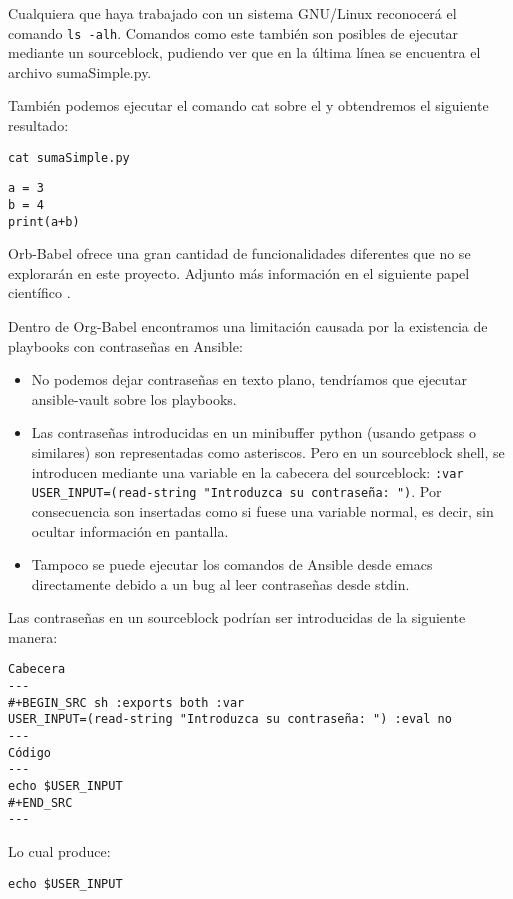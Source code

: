 \documentclass[11pt]{article}
\begin{document}
Cualquiera que haya trabajado con un sistema GNU/Linux reconocerá el comando \texttt{ls -alh}. Comandos como este también son posibles de ejecutar mediante un sourceblock, pudiendo ver que en la última línea se encuentra el archivo sumaSimple.py.

También podemos ejecutar el comando cat sobre el y obtendremos el siguiente resultado:

\begin{verbatim}
cat sumaSimple.py
\end{verbatim}

\begin{verbatim}
a = 3
b = 4
print(a+b)
\end{verbatim}


Orb-Babel ofrece una gran cantidad de funcionalidades diferentes que no se explorarán en este proyecto. Adjunto más información en el siguiente papel científico \cite{schulte2012}.

Dentro de Org-Babel encontramos una limitación causada por la existencia de playbooks con contraseñas en Ansible:
\begin{itemize}
\item No podemos dejar contraseñas en texto plano, tendríamos que ejecutar ansible-vault sobre los playbooks.
\item Las contraseñas introducidas en un minibuffer python (usando getpass o similares) son representadas como asteriscos. Pero en un sourceblock shell, se introducen mediante una variable en la cabecera del sourceblock: \texttt{:var USER\_INPUT=(read-string "Introduzca su contraseña: ")}. Por consecuencia son insertadas como si fuese una variable normal, es decir, sin ocultar información en pantalla.
\item Tampoco se puede ejecutar los comandos de Ansible desde emacs directamente debido a un bug al leer contraseñas desde stdin.
\end{itemize}

Las contraseñas en un sourceblock podrían ser introducidas de la siguiente manera:
\begin{verbatim}
Cabecera
---
#+BEGIN_SRC sh :exports both :var
USER_INPUT=(read-string "Introduzca su contraseña: ") :eval no
---
Código
---
echo $USER_INPUT
#+END_SRC
---
\end{verbatim}

Lo cual produce:

\begin{verbatim}
echo $USER_INPUT
\end{verbatim}
\end{document}
